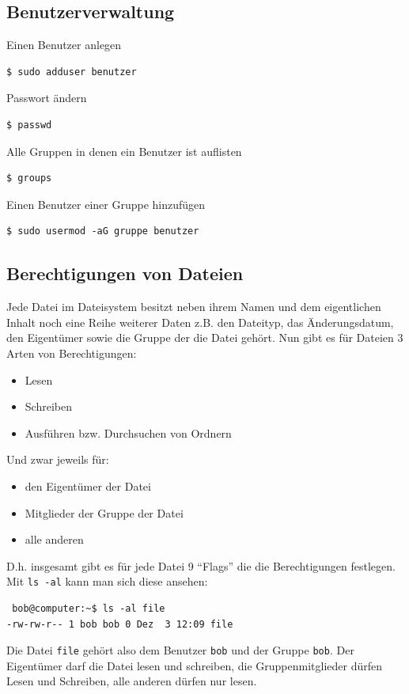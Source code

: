 \subsection {Benutzerverwaltung}
\begin{multicols}{2}
Einen Benutzer anlegen
\begin{lstlisting}
$ sudo adduser benutzer
\end{lstlisting}
\columnbreak
Passwort ändern
\begin{lstlisting}
$ passwd
\end{lstlisting}
\end{multicols}

\begin{multicols}{2}
Alle Gruppen in denen ein Benutzer ist auflisten
\begin{lstlisting}
$ groups
\end{lstlisting}
\columnbreak
Einen Benutzer einer Gruppe hinzufügen
\begin{lstlisting}
$ sudo usermod -aG gruppe benutzer
\end{lstlisting}
\end{multicols}

\subsection {Berechtigungen von Dateien}
Jede Datei im Dateisystem besitzt neben ihrem Namen und dem eigentlichen Inhalt noch eine Reihe weiterer Daten z.B. den Dateityp, das Änderungsdatum, den Eigentümer sowie die Gruppe der die Datei gehört. Nun gibt es für Dateien 3 Arten von Berechtigungen:
\begin{itemize}
 \item Lesen
 \item Schreiben
 \item Ausführen bzw. Durchsuchen von Ordnern
\end{itemize}

Und zwar jeweils für:
\begin{itemize}
 \item den Eigentümer der Datei
 \item Mitglieder der Gruppe der Datei
 \item alle anderen
\end{itemize}

D.h. insgesamt gibt es für jede Datei 9 ``Flags'' die die Berechtigungen festlegen. Mit \lstinline|ls -al| kann man sich diese ansehen:
\begin{lstlisting}
 bob@computer:~$ ls -al file
-rw-rw-r-- 1 bob bob 0 Dez  3 12:09 file
\end{lstlisting}
Die Datei \lstinline|file| gehört also dem Benutzer \lstinline|bob| und der Gruppe \lstinline|bob|. Der Eigentümer darf die Datei lesen und schreiben, die Gruppenmitglieder dürfen Lesen und Schreiben, alle anderen dürfen nur lesen.\par


